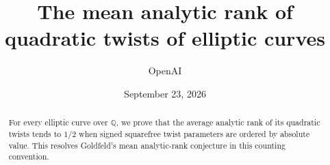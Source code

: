 \documentclass[11pt]{article}
\title{The mean analytic rank of quadratic twists of elliptic curves}
\author{OpenAI}
\date{September 23, 2026}
\numberwithin{equation}{section}
\theoremstyle{definition}
\theoremstyle{remark}
\newcommand{\Q}{\mathbb Q}
\begin{document}
\maketitle
\begin{abstract}
For every elliptic curve over \(\Q\), we prove that the average analytic
rank of its quadratic twists tends to \(1/2\) when signed squarefree twist
parameters are ordered by absolute value. This resolves Goldfeld's mean
analytic-rank conjecture in this counting convention.
\end{abstract}











\end{document}
